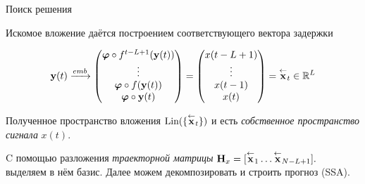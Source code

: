 	\begin{frame}{Поиск решения}
		
		\begin{theorem}[Такенс]
			Искомое вложение даётся построением соответствующего вектора задержки 
			
			\begin{equation*}
				\textbf{y}(t) \xrightarrow{emb} \begin{pmatrix}
					\boldsymbol{\varphi} \circ f^{t - L + 1}(\textbf{y}(t)) \\
					\vdots \\
					\boldsymbol{\varphi} \circ f(\textbf{y}(t)) \\
					\boldsymbol{\varphi} \circ \textbf{y}(t)
				\end{pmatrix} = \begin{pmatrix}
					x(t - L + 1) \\
					\vdots \\
					x(t - 1) \\
					x(t)
				\end{pmatrix} = \overset{\leftarrow}{\textbf{x}}_{t} \in \mathbb{R}^L
			\end{equation*}
			
		\end{theorem}
		
		Полученное пространство вложения $ \text{Lin}(\{\overset{\leftarrow}{\textbf{x}}_{t}\}) $ и есть \emph{собственное пространство сигнала} $ x(t) $.
		
		C помощью разложения \emph{траекторной матрицы} $ \mathbf{H}_x = [ \overset{\leftarrow}{\textbf{x}}_{1} \ldots  \overset{\leftarrow}{\textbf{x}}_{N - L + 1}]. $ выделяем в нём базис. Далее можем декомпозировать и строить прогноз (SSA). 
	
	\end{frame}
	
